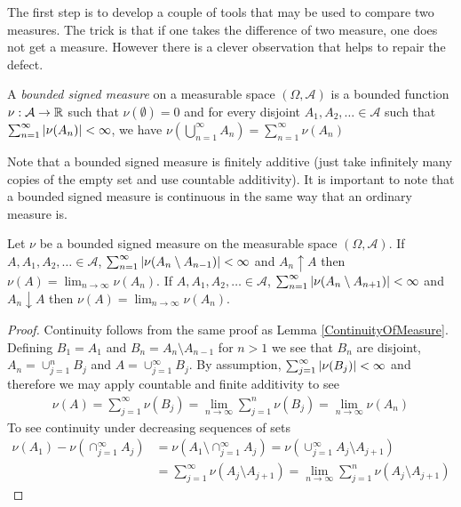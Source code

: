 The first step is to develop a couple of tools that may be used to
compare two measures.  The trick is that if one takes the difference
of two measure, one does not get a measure.  However there is a clever
observation that helps to repair the defect.  
\begin{defn}A \emph{ bounded signed measure} on a measurable space $(\Omega,
  \mathcal{A})$ is a bounded function $\nu : \mathcal{A} \to
  \mathbb{R}$ such that $\nu(\emptyset) = 0$ and for every disjoint $A_1, A_2, \dots \in
  \mathcal{A}$ such that $\sum_{n=1}^\infty \left \vert \nu (A_n) \right \vert  < \infty$, we have $\nu(\bigcup_{n=1}^\infty A_n ) =
  \sum_{n=1}^\infty \nu (A_n)$ 
\end{defn}
Note that a bounded signed measure is finitely additive (just take
infinitely many copies of the empty set and use countable additivity).
It is important to note that a bounded signed measure is continuous in
the same way that an ordinary measure is.
\begin{prop}\label{ContinuityOfSignedMeasure}Let $\nu$ be a bounded
  signed measure on the measurable space $(\Omega,  \mathcal{A})$.
If $A, A_1, A_2, \dotsc \in \mathcal{A}$, $\sum_{n=1}^\infty \left \vert \nu(A_n \setminus A_{n-1}) \right \vert < \infty$ and $A_n \uparrow A$ then $\nu(A) = \lim_{n \to \infty} \nu(A_n)$. If $A, A_1, A_2, \dotsc \in \mathcal{A}$, $\sum_{n=1}^\infty \left \vert \nu(A_n \setminus A_{n+1}) \right \vert < \infty$ and $A_n \downarrow A$ then $\nu(A) = \lim_{n \to \infty} \nu(A_n)$.
\end{prop}
\begin{proof}
Continuity follows from the same proof as Lemma \ref{ContinuityOfMeasure}.  Defining $B_1 = A_1$ and $B_n = A_n \setminus A_{n-1}$ for $n > 1$ we see that $B_n$ are disjoint, $A_n = \cup_{j=1}^n B_j$ and $A = \cup_{j=1}^\infty B_j$.  By assumption, $\sum_{j=1}^\infty \left \vert \nu(B_j) \right \vert < \infty$ and therefore we may apply countable and finite additivity to see
\begin{align*}
\nu(A) = \sum_{j=1}^\infty \nu(B_j) = \lim_{n \to \infty} \sum_{j=1}^n \nu(B_j) = \lim_{n \to \infty} \nu(A_n)
\end{align*}
To see continuity under decreasing sequences of sets 
\begin{align*}
\nu(A_1) - \nu(\cap_{j=1}^\infty A_j) &= \nu(A_1 \setminus \cap_{j=1}^\infty A_j) = \nu(\cup_{j=1}^\infty A_j \setminus A_{j+1}) \\
&= \sum_{j=1}^\infty\nu(A_j \setminus A_{j+1}) = \lim_{n \to \infty} \sum_{j=1}^n\nu(A_j \setminus A_{j+1}) 
\end{align*}
\end{proof}

